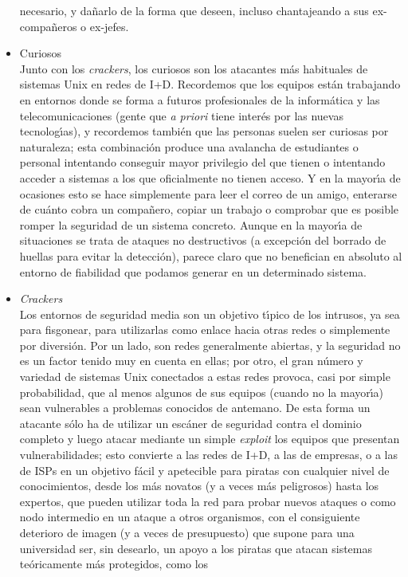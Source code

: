 \begin{itemize}
necesario, y da\~narlo de la forma que deseen, incluso chantajeando a sus 
ex-compa\~neros o ex-jefes.
\item Curiosos\\
Junto con los {\it crackers}, los curiosos son los atacantes m\'as habituales
de sistemas Unix en redes de I+D. Recordemos que los equipos est\'an trabajando
en entornos donde se forma a futuros profesionales de la inform\'atica y las
telecomunicaciones (gente que {\it a priori} tiene inter\'es por las nuevas
tecnolog\'{\i}as), y recordemos tambi\'en que las personas suelen ser 
curiosas por naturaleza; esta combinaci\'on produce una avalancha de estudiantes
o personal intentando conseguir mayor privilegio del que tienen o intentando 
acceder a sistemas a los que oficialmente no tienen acceso. Y en la 
mayor\'{\i}a de ocasiones esto se hace simplemente para
leer el correo de un amigo, enterarse de cu\'anto cobra un compa\~nero, 
copiar un trabajo o comprobar que es posible romper la seguridad de un sistema 
concreto. Aunque en la mayor\'{\i}a de situaciones se trata de ataques no 
destructivos (a excepci\'on del borrado de huellas para evitar la detecci\'on),
parece claro que no benefician en absoluto al entorno de fiabilidad que podamos
generar en un determinado sistema.
\item {\it Crackers}\\
Los entornos de seguridad media son un objetivo t\'{\i}pico de los intrusos, ya 
sea para
fisgonear, para utilizarlas como enlace hacia otras redes o simplemente por
diversi\'on. Por un lado, son redes generalmente abiertas, y la seguridad no es 
un factor tenido muy en cuenta en ellas; por otro,
el gran n\'umero y variedad de sistemas Unix conectados a estas redes provoca,
casi por simple probabilidad, que al menos algunos de sus equipos (cuando no 
la mayor\'{\i}a) sean vulnerables a problemas conocidos de antemano. De esta 
forma un atacante s\'olo ha de utilizar un esc\'aner de seguridad contra el 
dominio completo y luego atacar mediante un simple {\it exploit} los equipos 
que presentan vulnerabilidades; esto convierte a las redes de I+D, a las de 
empresas, o a las de ISPs en un objetivo
f\'acil y apetecible para piratas con cualquier nivel de conocimientos, desde
los m\'as novatos (y a veces m\'as peligrosos) hasta los expertos, que pueden
utilizar toda la red para probar nuevos ataques o como nodo intermedio en un
ataque a otros organismos, con el consiguiente deterioro de imagen (y a veces
de presupuesto) que supone para una universidad ser, sin desearlo, un apoyo
a los piratas que atacan sistemas te\'oricamente m\'as protegidos, como los

\end{itemize}
